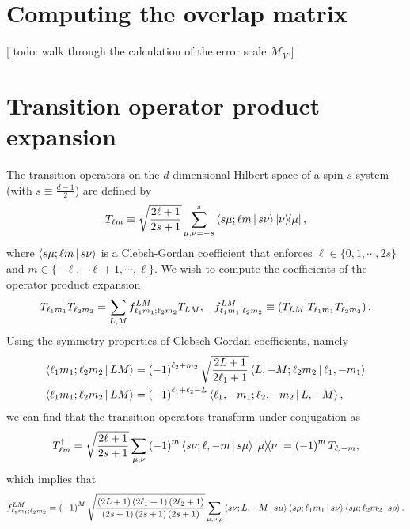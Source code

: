 \documentclass[notitlepage,twocolumn]{revtex4-2}
\newcommand{\f}[2]{\dfrac{#1}{#2}} %
\newcommand{\p}[1]{\left(#1\right)} %
\renewcommand{\set}[1]{\{#1\}} %
\newcommand{\bk}{\Braket} %
\newcommand{\1}{\mathds{1}}
\newcommand{\M}{\mathcal{M}}
\def\obk#1{\mathinner{({#1})}}
\newcommand{\red}[1]{{\color{red} #1}}
\begin{document}
\section{Computing the overlap matrix}
\label{sec:overlaps}

[\red{todo: walk through the calculation of the error scale $\M_V$.}]

\section{Transition operator product expansion}
\label{sec:trans_prod}

The transition operators on the $d$-dimensional Hilbert space of a spin-$s$ system (with $s\equiv\frac{d-1}{2}$) are defined by
\begin{align}
  T_{\ell m} \equiv \sqrt{\f{2\ell+1}{2s+1}} \sum_{\mu,\nu=-s}^s
  \bk{s\mu;\ell m|s\nu} \op{\nu}{\mu},
\end{align}
where $\bk{s\mu;\ell m|s\nu}$ is a Clebsh-Gordan coefficient that enforces $\ell\in\set{0,1,\cdots,2s}$ and $m\in\set{-\ell,-\ell+1,\cdots,\ell}$.
We wish to compute the coefficients of the operator product expansion
\begin{align}
  T_{\ell_1 m_1} T_{\ell_2 m_2}
  = \sum_{L,M} f_{\ell_1 m_1;\ell_2 m_2}^{LM} T_{LM},
  &&
  f_{\ell_1 m_1;\ell_2 m_2}^{LM}
  \equiv \obk{T_{LM} | T_{\ell_1 m_1} T_{\ell_2 m_2}}.
\end{align}
Using the symmetry properties of Clebsch-Gordan coefficients, namely
\begin{align}
  \bk{\ell_1 m_1; \ell_2 m_2| L M}
  &= \p{-1}^{\ell_2+m_2} \sqrt{\f{2L+1}{2\ell_1+1}}
  \bk{L,-M; \ell_2 m_2| \ell_1,-m_1} \\
  \bk{\ell_1 m_1; \ell_2 m_2| L M}
  &= \p{-1}^{\ell_1+\ell_2-L}
  \bk{\ell_1,-m_1; \ell_2,-m_2| L,-M},
\end{align}
we can find that the transition operators transform under conjugation as
\begin{align}
  T_{\ell m}^\dag
  = \sqrt{\f{2\ell+1}{2s+1}}
  \sum_{\mu,\nu} \p{-1}^m \bk{s\nu;\ell,-m|s\mu} \op{\mu}{\nu}
  = \p{-1}^m T_{\ell,-m},
\end{align}
which implies that
\begin{align}
  f_{\ell_1 m_1;\ell_2 m_2}^{LM}
  = \p{-1}^M \sqrt{\f{\p{2L+1}\p{2\ell_1+1}\p{2\ell_2+1}}
    {\p{2s+1}\p{2s+1}\p{2s+1}}}
  \sum_{\mu,\nu,\rho} \bk{s\nu;L,-M|s\mu}
  \bk{s\rho;\ell_1m_1|s\nu} \bk{s\mu;\ell_2m_2|s\rho}.
\end{align}
\end{document}
